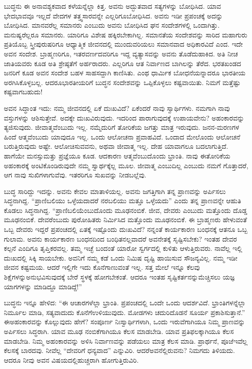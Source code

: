 ಬುದ್ಧನು ಈ ಅನಾವಶ್ಯಕವಾದ ಕಳೆಯನ್ನೆಲ್ಲಾ ಕಿತ್ತ. ಅವನು ಅದ್ಭುತವಾದ ಸತ್ಯಗಳನ್ನು ಬೋಧಿಸಿದ. ಯಾವ ಭೇದಭಾವವೂ ಇಲ್ಲದೆ ವೇದಗಳ ತತ್ತ್ವಸಾರವನ್ನೇ ಎಲ್ಲರಿಗೂ\break ಬೋಧಿಸಿದ. ಅವನು ಇಡೀ ಪ್ರಪಂಚಕ್ಕೆ ಅದನ್ನು ಬೋಧಿಸಿದ. ಮಾನವರೆಲ್ಲ ಸಮಾನರು ಎಂಬುದು ಅವನು ಬೋಧಿಸಿದ ಘನ ಸಂದೇಶಗಳಲ್ಲಿ ಒಂದಾಗಿತ್ತು. ಮನುಷ್ಯರೆಲ್ಲರೂ ಸಮಾನರು. ಯಾರಿಗೂ ವಿಶೇಷ ಹಕ್ಕಿರಬೇಕಾಗಿಲ್ಲ. ಸಮಾನತೆಯ ಸಂದೇಶವನ್ನು ಸಾರಿದ ಮಹಾಗುರು ಪ್ರತಿಯೊಬ್ಬ ಸ್ತ್ರೀಪುರುಷರಿಗೂ ಆಧ್ಯಾತ್ಮಿಕ ಜೀವನದಲ್ಲಿ ಮುಂದುವರಿಯಲು ಸಮಾನವಾದ ಅಧಿಕಾರವಿದೆ ಎಂದ. ಇದೇ ಅವನ ಸಂದೇಶ. ಬ್ರಾಹ್ಮಣರಿಗೂ, ಇತರ\break ವರ್ಣದವರಿಗೂ ಇದ್ದ ವ್ಯತ್ಯಾಸವನ್ನು ಅವನು ತೊಡೆದುಹಾಕಿದ. ಅತಿ ನೀಚ ಜಾತಿ\-ಯವರು ಕೂಡ ಅತಿ ಶ್ರೇಷ್ಠತೆಗೆ ಅರ್ಹರಾದರು. ಎಲ್ಲರಿಗೂ ಆತ ನಿರ್ವಾಣದ ಬಾಗಿಲನ್ನು ತೆರೆದ. ಭರತಖಂಡದ ಜನರಿಗೆ ಕೂಡ ಅವನ ಸಂದೇಶ ಬಹಳ ಸಾಹಸದ್ದಾಗಿ ಕಾಣಿಸಿತು. ಎಂಥ ಧಾರ್ಮಿಕ ಬೋಧನೆಯನ್ನಾದರೂ ಭಾರತೀಯ ಅರಗಿಸಿಕೊಳ್ಳಬಲ್ಲ. ಆದರೂ\break ಭಾರತೀಯರಿಗೆ ಬುದ್ಧನ ಸಂದೇಶವನ್ನು ಒಪ್ಪಿಕೊಳ್ಳಲು ಕಷ್ಟವಾಯಿತು. ನಿಮಗೆ ಮತ್ತೆಷ್ಟು ಕಷ್ಟವಾಗಬಹುದು!

ಅವನ ಸಿದ್ಧಾಂತ ಇದು: ನಮ್ಮ ಜೀವನದಲ್ಲಿ ಏಕೆ ದುಃಖವಿದೆ? ಏಕೆಂದರೆ ನಾವು ಸ್ವಾರ್ಥಿಗಳು. ನಮಗಾಗಿ ನಾವು ವಸ್ತುಗಳನ್ನು ಆಶಿಸುತ್ತೇವೆ. ಅದಕ್ಕೇ ದುಃಖವಿರುವುದು. ಇದರಿಂದ ಪಾರಾಗುವುದಕ್ಕೆ ಉಪಾಯವೇನು? ಅಹಂಕಾರವನ್ನು ತ್ಯಜಿಸುವುದು. ಜೀವಾತ್ಮವೆಂಬುದು ಇಲ್ಲ. ನಮ್ಮೆದುರಿಗೆ ತೋರಿಕೆಯ ಜಗತ್ತು ಮಾತ್ರ ಇರುವುದು. ಜನನ-ಮರಣಗಳ ಹಿಂದೆ ಆತ್ಮವೆಂಬುದು ಯಾವುದೂ ಇಲ್ಲ. ಒಂದು ಆಲೋಚನಾ ಪ್ರವಾಹವಿದೆ. ಒಂದಾದ ಮೇಲೊಂದು ಆಲೋಚನೆ ಬರುತ್ತಿರುವುದು ಅಷ್ಟೇ. ಆಲೋಚಿಸುವವನು, ಅಥವಾ ಜೀವಾತ್ಮ ಇಲ್ಲ. ದೇಹ ಯಾವಾಗಲೂ ಬದಲಾಗುತ್ತಿದೆ. ಹಾಗೆಯೇ ಮನಸ್ಸು\break ಮತ್ತು ಪ್ರಜ್ಞೆಯೂ ಕೂಡ. ಆದಕಾರಣ ಆತ್ಮವೆಂಬುದೊಂದು ಭ್ರಾಂತಿ. ನಾವು ಈ\break ತೋರಿಕೆಯ ಅಹಂಕಾರಕ್ಕೆ ಅಂಟಿಕೊಂಡಿರುವುದೇ ನಮ್ಮ ಸ್ವಾರ್ಥಕ್ಕೆಲ್ಲ ಮೂಲ. ಜೀವಾತ್ಮ ಎಂಬುದಿಲ್ಲ ಎಂಬುದು ನಮಗೆ ಗೊತ್ತಾದರೆ, ಆಗ ನಾವು ಸುಖಿಗಳಾಗುವೆವು. ಇತರರಿಗೂ ಸುಖವನ್ನು ನೀಡಬಲ್ಲೆವು.

ಬುದ್ಧ ಸಾರಿದ್ದು ಇದನ್ನು. ಅವನು ಕೇವಲ ಮಾತಾಳಿಯಲ್ಲ. ಅವನು ಜಗತ್ತಿಗಾಗಿ ತನ್ನ ಪ್ರಾಣವನ್ನು ಅರ್ಪಿಸಲು ಸಿದ್ಧನಾಗಿದ್ದ. “ಪ್ರಾಣಿಬಲಿಯು ಒಳ್ಳೆಯದಾದರೆ ನರಬಲಿಯು ಮತ್ತೂ ಒಳ್ಳೆಯದು” ಎಂದು ತನ್ನ ಪ್ರಾಣವನ್ನೇ ಆಹುತಿ ಕೊಡಲು ಸಿದ್ಧನಾಗಿದ್ದ. “ಪ್ರಾಣಿಬಲಿಯೆಂಬುದೊಂದು ಮೂಢನಂಬಿಕೆ. ಜೀವ, ದೇವರು ಎಂಬುದು ಮತ್ತೊಂದು ದೊಡ್ಡ ಮೂಢನಂಬಿಕೆ. ದೇವರೆಂಬುದು ಪುರೋಹಿತರು ನಿರ್ಮಿಸಿದ ಮತ್ತೊಂದು ಮೂಢನಂಬಿಕೆ. ಈ ಬ್ರಾಹ್ಮಣರು ಹೇಳುವಂತೆ ಒಬ್ಬ ದೇವರು ಇದ್ದರೆ ಪ್ರಪಂಚದಲ್ಲಿ ಏತಕ್ಕೆ ಇಷ್ಟೊಂದು ದುಃಖವಿದೆ? ನನ್ನಂತೆ ಕಾರ್ಯಕಾರಣ ಬಂಧನಕ್ಕೆ ಆತನೂ ಒಬ್ಬ ಗುಲಾಮ. ಅವನು ಕಾರ್ಯಕಾರಣ ಬಂಧನದಿಂದ ಬಂಧಿತನಲ್ಲವಾದರೆ ಅವನೇತಕ್ಕೆ ಸೃಷ್ಟಿಸಬೇಕು? ಇಂತಹ ದೇವರ ಕಲ್ಪನೆ ಎಂದಿಗೂ ತೃಪ್ತಿಕರವಲ್ಲ. ತಮ್ಮ ಇಚ್ಛೆ ಬಂದಂತೆ ಯಾರೋ ಸ್ವರ್ಗದಲ್ಲಿ ಕುಳಿತು ಆಳುತ್ತಿರುವರು. ನಾವೆಲ್ಲ ಇಲ್ಲಿ ದುಃಖದಲ್ಲಿ ಸಿಕ್ಕಿ ಸಾಯಬೇಕು. ಅವನಿಗೆ ನಮ್ಮ ಕಡೆ ಒಂದು ನಿಮಿಷ ದೃಷ್ಟಿ ಹಾಯಿಸುವ ಸೌಜನ್ಯವಿಲ್ಲ. ನಮ್ಮ ಇಡೀ ಜೀವನ ಕಷ್ಟಮಯ. ಆದರೆ ಇಲ್ಲಿಗೇ ಇದು ಕೊನೆಗಾಣುವಂತೆ ಇಲ್ಲ. ಸತ್ತ ಮೇಲೆ ಇನ್ನೂ ಕೆಲವು ಶಿಕ್ಷೆಗಳನ್ನು\break ಅನುಭವಿಸುವುದಕ್ಕೆ ಬೇರೆ ಸ್ಥಳಕ್ಕೆ ಹೋಗಬೇಕಂತೆ. ಆದರೂ ಇಂತಹ ಸೃಷ್ಟಿಕರ್ತನನ್ನು\break ಮೆಚ್ಚಿಸಲು ಯಜ್ಞ ಯಾಗಗಳನ್ನು ಮಾಡಿದ್ದೂ ಮಾಡಿದ್ದೆ!”

ಬುದ್ಧನು ಇನ್ನೂ ಹೇಳಿದ: “ಈ ಆಚಾರಗಳೆಲ್ಲಾ ಭ್ರಾಂತಿ. ಪ್ರಪಂಚದಲ್ಲಿ ಒಂದೇ ಒಂದು ಆದರ್ಶವಿದೆ. ಭ್ರಾಂತಿಗಳನ್ನೆಲ್ಲಾ ನಿರ್ಮೂಲ ಮಾಡಿ, ಸತ್ಯವಾದುದು ಕೊನೆಗೆ\break ಉಳಿಯುವುದು. ಮೋಡಗಳು ಚದುರಿದೊಡನೆ ಸೂರ್ಯ ಪ್ರಕಾಶಿಸುತ್ತಾನೆ.” ಈ\break ಅಹಂಕಾರವನ್ನು ಕೊಲ್ಲುವುದು ಹೇಗೆ? ಸಂಪೂರ್ಣ ನಿಃಸ್ವಾರ್ಥಿಗಳಾಗಿ, ಒಂದು ಇರುವೆಗಾಗಿಯೂ ನಿಮ್ಮ ಪ್ರಾಣವನ್ನು ಅರ್ಪಿಸಲು ಸಿದ್ಧರಾಗಿ. ಯಾವ ಮೂಢ ನಂಬಿಕೆಗಾಗಿಯೂ ಕೆಲಸ ಮಾಡಬೇಡಿ. ಯಾವ ಪ್ರತಿಫಲಕ್ಕಾಗಿಯೂ ಕೆಲಸ ಮಾಡಬೇಡಿ. ನಿಮ್ಮ ಅಹಂಕಾರವನ್ನು ಅಳಿಸಿ ನಿರ್ವಾಣವನ್ನು ಪಡೆಯಲು ಮಾತ್ರ ಕೆಲಸ ಮಾಡಿ. ಪ್ರಾರ್ಥನೆ, ಪೂಜೆ\break ಇವೆಲ್ಲ ಕೆಲಸಕ್ಕೆ ಬಾರದವು. ನೀವೆಲ್ಲ “ದೇವರಿಗೆ ಧನ್ಯವಾದ” ಎನ್ನುವಿರಿ. ಆದರೆ\break ಅವನೆಲ್ಲಿರುವನು? ನಿಮಗದು ತಿಳಿಯದು. ಆದರೂ ನೀವು ಅವನ ವಿಷಯದಲ್ಲಿ\break ಹುಚ್ಚರಾಗಿ ಹೋಗುತ್ತಿರುವಿರಿ.

